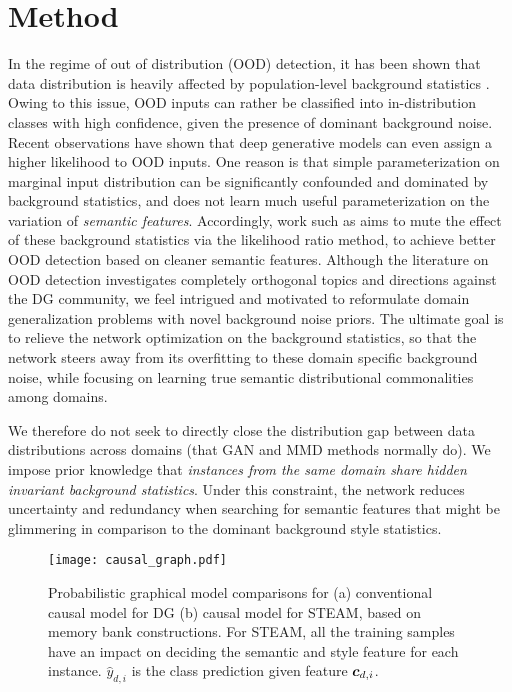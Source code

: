\documentclass[10pt,twocolumn,letterpaper]{article}
\newcommand{\bc}{\mbox{\boldmath $c$}}
\newcommand{\0}{{\bf 0}}
\begin{document}
\section{Method}
In the regime of out of distribution (OOD) detection, it has been shown that data distribution is heavily affected by population-level background statistics \cite{choi2018generative,nalisnick2018deep,ren2019likelihood,serra2019input}. Owing to this issue, OOD inputs can rather be classified into in-distribution classes with high confidence, given the presence of dominant background noise. Recent observations \cite{choi2018generative,nalisnick2018deep} have shown that deep generative models can even assign a higher likelihood to OOD inputs. One reason is that simple parameterization on marginal input distribution can be significantly confounded and dominated by background statistics, and does not learn much useful parameterization on the variation of {\emph{semantic features}}. Accordingly, work such as \cite{ren2019likelihood} aims to mute the effect of these background statistics via the likelihood ratio method, to achieve better OOD detection based on cleaner semantic features. Although the literature on OOD detection investigates completely orthogonal topics and directions against the DG community, we feel intrigued and motivated to reformulate domain generalization problems with novel background noise priors. The ultimate goal is to relieve the network optimization on the background statistics, so that the network steers away from its overfitting to these domain specific background noise, while focusing on learning true semantic distributional commonalities among domains.

We therefore do not seek to directly close the distribution gap between data distributions across domains (that GAN and MMD methods normally do). We impose prior knowledge that {\emph{ instances from the same domain share hidden invariant background statistics}}. Under this constraint, the network reduces uncertainty and redundancy when searching for semantic features that might be glimmering in comparison to the dominant background style statistics.

\begin{figure}[t]
\center
\texttt{[image: causal\_graph.pdf]}
\caption{Probabilistic graphical model comparisons for (a) conventional causal model for DG (b) causal model for STEAM, based on memory bank constructions. For STEAM, all the training samples have an impact on deciding the semantic and style feature for each instance. $\hat{y}_{d,i}$ is the class prediction given feature $\bc_{d,i}$.}
\label{fig:causal_graph}
\end{figure}
\end{document}
